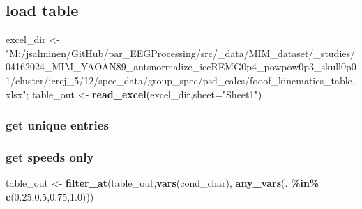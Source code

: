 \documentclass[
]{article}
\newenvironment{Shaded}{\begin{snugshade}}{\end{snugshade}}
\newcommand{\AttributeTok}[1]{\textcolor[rgb]{0.13,0.29,0.53}{#1}}
\newcommand{\FunctionTok}[1]{\textcolor[rgb]{0.13,0.29,0.53}{\textbf{#1}}}
\newcommand{\NormalTok}[1]{#1}
\newcommand{\OtherTok}[1]{\textcolor[rgb]{0.56,0.35,0.01}{#1}}
\newcommand{\SpecialCharTok}[1]{\textcolor[rgb]{0.81,0.36,0.00}{\textbf{#1}}}
\newcommand{\StringTok}[1]{\textcolor[rgb]{0.31,0.60,0.02}{#1}}
\begin{document}
\hypertarget{load-table}{%
\subsection{load table}\label{load-table}}

\begin{Shaded}
\begin{Highlighting}[]
\NormalTok{excel\_dir }\OtherTok{\textless{}{-}}\StringTok{"M:/jsalminen/GitHub/par\_EEGProcessing/src/\_data/MIM\_dataset/\_studies/04162024\_MIM\_YAOAN89\_antsnormalize\_iccREMG0p4\_powpow0p3\_skull0p01/cluster/icrej\_5/12/spec\_data/group\_spec/psd\_calcs/fooof\_kinematics\_table.xlsx"}\NormalTok{;}
\NormalTok{table\_out }\OtherTok{\textless{}{-}} \FunctionTok{read\_excel}\NormalTok{(excel\_dir,}\AttributeTok{sheet=}\StringTok{"Sheet1"}\NormalTok{) }
\end{Highlighting}
\end{Shaded}

\hypertarget{get-unique-entries}{%
\subsubsection{get unique entries}\label{get-unique-entries}}

\begin{Shaded}
\end{Shaded}

\hypertarget{get-speeds-only}{%
\subsubsection{get speeds only}\label{get-speeds-only}}

\begin{Shaded}
\begin{Highlighting}[]
\NormalTok{table\_out }\OtherTok{\textless{}{-}} \FunctionTok{filter\_at}\NormalTok{(table\_out,}\FunctionTok{vars}\NormalTok{(}\StringTok{\textquotesingle{}cond\_char\textquotesingle{}}\NormalTok{), }\FunctionTok{any\_vars}\NormalTok{(. }\SpecialCharTok{\%in\%} \FunctionTok{c}\NormalTok{(}\StringTok{\textquotesingle{}0.25\textquotesingle{}}\NormalTok{,}\StringTok{\textquotesingle{}0.5\textquotesingle{}}\NormalTok{,}\StringTok{\textquotesingle{}0.75\textquotesingle{}}\NormalTok{,}\StringTok{\textquotesingle{}1.0\textquotesingle{}}\NormalTok{))) }
\end{Highlighting}
\end{Shaded}
\end{document}
